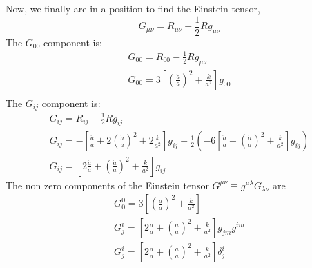\documentclass[12pt]{report}
\begin{document}
Now, we finally are in a position to find the Einstein tensor,
\begin{equation*}
G_{\mu \nu}= R_{\mu \nu} - \frac{1}{2}R g_{\mu \nu}
\end{equation*}
The $G_{00}$ component is:
\begin{eqnarray*}
G_{00}=R_{00}- \frac{1}{2}R g_{\mu \nu}\\
G_{00}=3\left[ \left(\frac{\dot{a}}{a}\right)^2 +\frac{k}{a^2}\right]g_{00}\\
\end{eqnarray*}
The $G_{ij}$ component is:
\begin{eqnarray*}
G_{ij}= R_{ij} - \frac{1}{2}R g_{ij}\\
G_{ij}=-\left[\frac{\ddot{a}}{a} + 2\left(\frac{\dot{a}}{a}\right)^2 +2\frac{k}{a^2}\right]g_{ij} - \frac{1}{2}(-6\left[\frac{\ddot{a}}{a} + \left(\frac{\dot{a}}{a}\right)^2 +\frac{k}{a^2}\right] g_{ij})\\
G_{ij}=\left[2\frac{\ddot{a}}{a} + \left(\frac{\dot{a}}{a}\right)^2 +\frac{k}{a^2}\right] g_{ij}
\end{eqnarray*}
The non zero components of the Einstein tensor $G^{\mu \nu} \equiv g^{\mu \lambda}G_{\lambda \nu}$ are
\begin{eqnarray*}
G^0_0=3\left[\left(\frac{\dot{a}}{a}\right)^2 +\frac{k}{a^2}\right]\\
G^i_j=\left[2\frac{\ddot{a}}{a} + \left(\frac{\dot{a}}{a}\right)^2 +\frac{k}{a^2}\right] g_{jm} g^{i m}\\
G^i_j=\left[2\frac{\ddot{a}}{a} + \left(\frac{\dot{a}}{a}\right)^2 +\frac{k}{a^2}\right] \delta^i_j\\
\end{eqnarray*}
\end{document}
